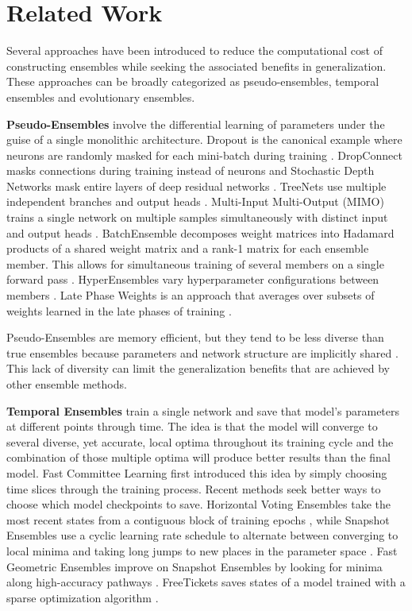 \documentclass[letterpaper]{article} %
\begin{document}
\section{Related Work}

Several approaches have been introduced to reduce the computational cost of constructing ensembles while seeking the associated benefits in generalization. These approaches can be broadly categorized as pseudo-ensembles, temporal ensembles and evolutionary ensembles.

\textbf{Pseudo-Ensembles} involve the differential learning of parameters under the guise of a single monolithic architecture. Dropout is the canonical example where neurons are randomly masked for each mini-batch during training \cite{srivastava2014dropout}. DropConnect masks connections during training instead of neurons \cite{wan2013regularization} and Stochastic Depth Networks mask entire layers of deep residual networks \cite{huang2016stochastic}. TreeNets use multiple independent branches and output heads \cite{lee2015m}. Multi-Input Multi-Output (MIMO) trains a single network on multiple samples simultaneously with distinct input and output heads \cite{havasi2021training}. BatchEnsemble decomposes weight matrices into Hadamard products of a shared weight matrix and a rank-1 matrix for each ensemble member. This allows for simultaneous training of several members on a single forward pass \cite{wen2020batchensemble}. HyperEnsembles vary hyperparameter configurations between members \cite{wenzel2021hyperparameter}. Late Phase Weights is an approach that averages over subsets of weights learned in the late phases of training \cite{vonoswald2021neural}.

Pseudo-Ensembles are memory efficient, but they tend to be less diverse than true ensembles because parameters and network structure are implicitly shared \cite{bachman2014learning}. This lack of diversity can limit the generalization benefits that are achieved by other ensemble methods.
 
\textbf{Temporal Ensembles} train a single network and save that model's parameters at different points through time. The idea is that the model will converge to several diverse, yet accurate, local optima throughout its training cycle and the combination of those multiple optima will produce better results than the final model. Fast Committee Learning \cite{swann1998fast} first introduced this idea by simply choosing time slices through the training process. Recent methods seek better ways to choose which model checkpoints to save. Horizontal Voting Ensembles take the most recent states from a contiguous block of training epochs \cite{xie2013horizontal}, while Snapshot Ensembles use a cyclic learning rate schedule to alternate between converging to local minima and taking long jumps to new places in the parameter space \cite{huang2017snapshot}. Fast Geometric Ensembles improve on Snapshot Ensembles by looking for minima along high-accuracy pathways \cite{garipov2018loss}. FreeTickets saves states of a model trained with a sparse optimization algorithm \cite{liu2021freetickets}.
\end{document}
